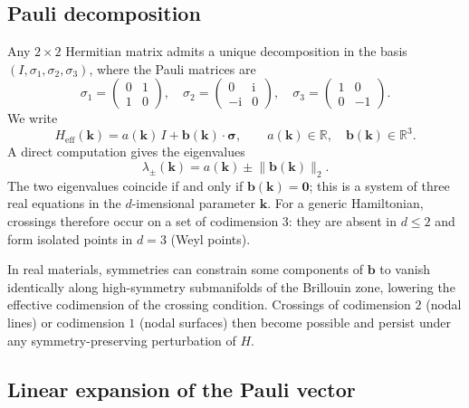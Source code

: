 \documentclass[11pt]{article}
\numberwithin{equation}{section}
\begin{document}
\subsection{Pauli decomposition}

Any \(2\times2\) Hermitian matrix admits a unique decomposition in the basis
\((I,\sigma_1,\sigma_2,\sigma_3)\), where the Pauli matrices are
\begin{equation}
    \sigma_1=\begin{pmatrix}0&1\\1&0\end{pmatrix},
    \quad
    \sigma_2=\begin{pmatrix}0&\mathrm{i}\\-\mathrm{i}&0\end{pmatrix},
    \quad
    \sigma_3=\begin{pmatrix}1&0\\0&-1\end{pmatrix}.
\end{equation}
We write
\begin{equation}
    H_{\mathrm{eff}}(\mathbf{k})
    = a(\mathbf{k})\,I
    + \mathbf{b}(\mathbf{k})\cdot\bm{\sigma},
    \qquad a(\mathbf{k})\in\mathbb{R},
    \quad \mathbf{b}(\mathbf{k})\in\mathbb{R}^3.
    \label{eq:pauli-decomp}
\end{equation}
A direct computation gives the eigenvalues
\begin{equation}
    \lambda_{\pm}(\mathbf{k})
    = a(\mathbf{k})\pm\lVert\mathbf{b}(\mathbf{k})\rVert_2.
    \label{eq:pauli-eigenvalues}
\end{equation}
The two eigenvalues coincide if and only if \(\mathbf{b}(\mathbf{k})=\mathbf{0}\); this
is a system of three real equations in the \(d\)-imensional parameter
\(\mathbf{k}\).  For a generic Hamiltonian, crossings therefore occur on a set of
codimension \(3\): they are absent in \(d\le 2\) and form isolated points in \(d=3\)
(Weyl points).

In real materials, symmetries can constrain some components of \(\mathbf{b}\) to
vanish identically along high-symmetry submanifolds of the Brillouin zone,
lowering the effective codimension of the crossing condition.  Crossings of
codimension \(2\) (nodal lines) or codimension \(1\) (nodal surfaces) then become
possible and persist under any symmetry-preserving perturbation of \(H\).

\subsection{Linear expansion of the Pauli vector}
\end{document}
